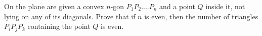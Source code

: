 On the plane are given a convex $n$-gon $P_1P_2....P_n$ and a point $Q$ inside it, not lying on any of its diagonals. Prove that if $n$ is even, then the number of triangles $P_iP_jP_k$ containing the point $Q$ is even.